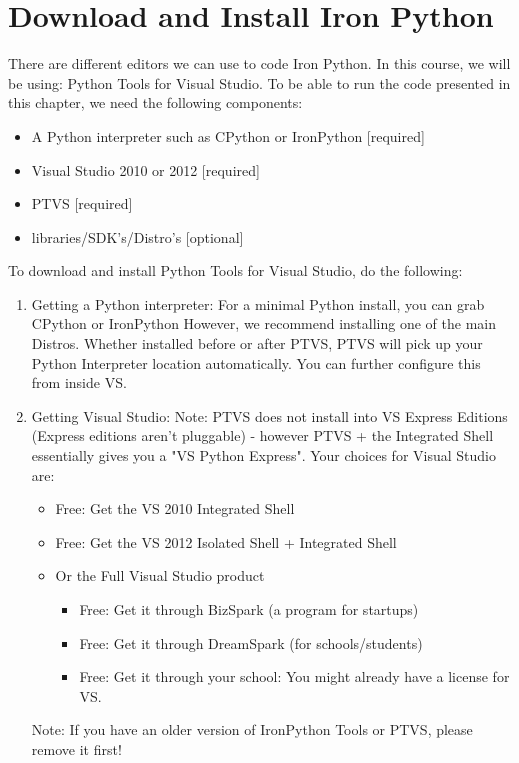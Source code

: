 \documentclass[12pt,a4paper,final,twoside,titlepage]{book}
\begin{document}
\section{Download and Install Iron Python}
There are different editors we can use to code Iron Python. In this course, we will be using: Python Tools for Visual Studio. To be able to run the code presented in this chapter, we need the following components:
\begin{itemize}
\item A Python interpreter such as CPython or IronPython [required]
\item Visual Studio 2010 or 2012 [required]
\item PTVS [required]
\item libraries/SDK’s/Distro’s [optional] 
\end{itemize}
To download and install Python Tools for Visual Studio, do the following:
\begin{enumerate}
\item Getting a Python interpreter:
For a minimal Python install, you can grab CPython or IronPython
However, we recommend installing one of the main Distros.
Whether installed before or after PTVS, PTVS will pick up your Python Interpreter location automatically.  You can further configure this from inside VS.
\item Getting Visual Studio: 
Note: PTVS does not install into VS Express Editions (Express editions aren't pluggable) - however PTVS + the Integrated Shell essentially gives you a "VS Python Express".
Your choices for Visual Studio are:
\begin{itemize}
\item Free: Get the VS 2010 Integrated Shell 
\item Free: Get the VS 2012 Isolated Shell + Integrated Shell 
\item Or the Full Visual Studio product
\begin{itemize}
\item Free: Get it through BizSpark (a program for startups)
\item Free: Get it through DreamSpark (for schools/students) 
\item Free: Get it through your school: You might already have a license for VS.
\end{itemize}
\end{itemize}
Note: If you have an older version of IronPython Tools or PTVS, please remove it first!
\end{enumerate}
\end{document}
